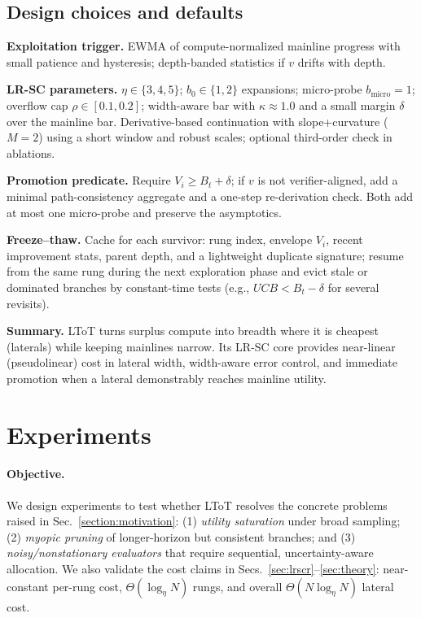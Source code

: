 \documentclass{article}
\begin{document}
\vspace{0.5em}
\subsection{Design choices and defaults}
\label{sec:defaults}

\textbf{Exploitation trigger.}
EWMA of compute-normalized mainline progress with small patience and hysteresis; depth-banded statistics if $v$ drifts with depth.

\textbf{LR-SC parameters.}
$\eta\in\{3,4,5\}$; $b_0\in\{1,2\}$ expansions; micro-probe $b_{\text{micro}}=1$; overflow cap $\rho\in[0.1,0.2]$; width-aware bar with $\kappa\!\approx\!1.0$ and a small margin $\delta$ over the mainline bar.
Derivative-based continuation with slope+curvature ($M{=}2$) using a short window and robust scales; optional third-order check in ablations.

\textbf{Promotion predicate.}
Require $V_i \ge B_t + \delta$; if $v$ is not verifier-aligned, add a minimal path-consistency aggregate and a one-step re-derivation check.
Both add at most one micro-probe and preserve the asymptotics.

\textbf{Freeze--thaw.}
Cache for each survivor: rung index, envelope $V_i$, recent improvement stats, parent depth, and a lightweight duplicate signature; resume from the same rung during the next exploration phase and evict stale or dominated branches by constant-time tests (e.g., $UCB<B_t-\delta$ for several revisits).

\textbf{Summary.}
LToT turns surplus compute into breadth where it is cheapest (laterals) while keeping mainlines narrow.
Its LR-SC core provides near-linear (pseudolinear) cost in lateral width, width-aware error control, and immediate promotion when a lateral demonstrably reaches mainline utility.

\section{Experiments}
\label{section:experiments}

\paragraph{Objective.}
We design experiments to test whether LToT resolves the concrete problems raised in Sec.~\ref{section:motivation}:
(1) \emph{utility saturation} under broad sampling; (2) \emph{myopic pruning} of longer-horizon but consistent branches; and
(3) \emph{noisy/nonstationary evaluators} that require sequential, uncertainty-aware allocation.
We also validate the cost claims in Secs.~\ref{sec:lrscr}--\ref{sec:theory}:
near-constant per-rung cost, $\Theta(\log_\eta N)$ rungs, and overall $\Theta(N\log_\eta N)$ lateral cost.
\end{document}
